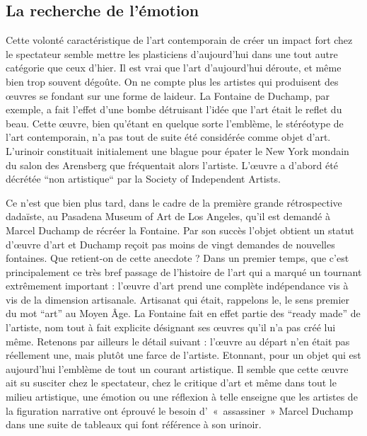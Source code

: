 \subsection{La recherche de l'émotion}
\xspace

	Cette volonté caractéristique de l'art contemporain de créer un impact fort chez le spectateur semble mettre les plasticiens d'aujourd'hui dans une tout autre catégorie que ceux d'hier. Il est vrai que l'art d'aujourd’hui déroute, et même bien trop souvent dégoûte. On ne compte plus les artistes qui produisent des \oe{}uvres se fondant sur une forme de laideur. 
La Fontaine de Duchamp, par exemple, a fait l'effet d'une bombe détruisant l'idée que l'art était le reflet du beau. Cette \oe{}uvre, bien qu'étant en quelque sorte l'emblème, le stéréotype de l'art contemporain, n'a pas tout de suite été considérée comme objet d'art. L'urinoir constituait initialement une blague pour épater le New York mondain du salon des Arensberg que fréquentait alors l'artiste. L'\oe{}uvre a d'abord été décrétée “non artistique“ par la Society of Independent Artists.

Ce n'est que bien plus tard, dans le cadre de la première grande rétrospective dadaïste, au Pasadena Museum of Art de Los Angeles, qu'il est demandé à Marcel Duchamp de récréer la Fontaine. Par son succès l’objet obtient un statut d'\oe{}uvre d'art et Duchamp reçoit pas moins de vingt demandes de nouvelles fontaines. Que retient-on de cette anecdote ? Dans un premier temps, que c'est principalement ce très bref passage de l'histoire de l'art qui a marqué un tournant extrêmement important : l'\oe{}uvre d'art prend une complète indépendance vis à vis de la dimension artisanale. Artisanat qui était, rappelons le, le sens  premier du mot “art” au Moyen Âge. La Fontaine fait en effet partie des “ready made” de l'artiste, nom tout à fait explicite désignant ses \oe{}uvres qu'il n'a pas créé lui même. Retenons par ailleurs le détail suivant : l'\oe{}uvre au départ n'en était pas réellement une, mais plutôt une farce de l'artiste. Etonnant, pour un objet qui est aujourd’hui l'emblème de tout un courant artistique. Il semble que cette \oe{}uvre ait su susciter chez le spectateur, chez le critique d'art et même dans tout le milieu artistique, une émotion ou une réflexion à telle enseigne que les artistes de la figuration narrative ont éprouvé le besoin d’ « assassiner » Marcel Duchamp dans une suite de tableaux qui font référence à son urinoir. 


